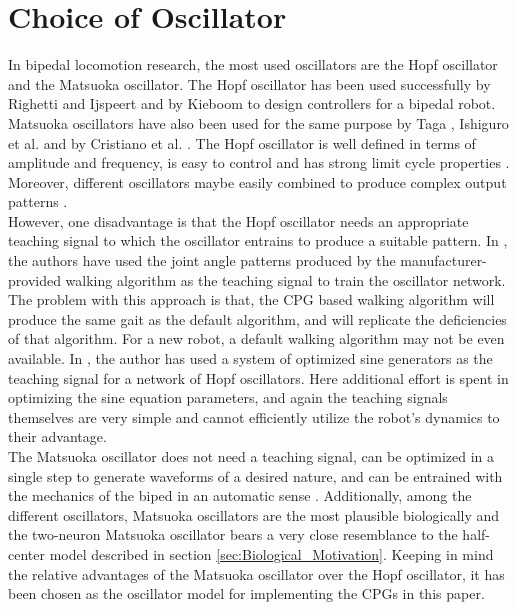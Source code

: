 \documentclass[12pt,twoside]{article}
\theoremstyle{plain}
\theoremstyle{definition}
\theoremstyle{remark}
\newcommand{\forceindent}{\leavevmode{\parindent=2em\indent}}
\begin{document}
\section{Choice of Oscillator}
\label{sec:Choice_of_Oscillator}
In bipedal locomotion research, the most used oscillators are the Hopf oscillator and the Matsuoka oscillator. The Hopf oscillator has been used successfully by Righetti and Ijspeert \cite{Righetti2006} and by Kieboom \cite{Kieboom2009} to design controllers for a bipedal robot. Matsuoka oscillators have also been used for the same purpose by Taga \cite{Taga1991}, Ishiguro et al. \cite{Ishiguro2003} and by Cristiano et al. \cite{cristiano2014locomotion}. The Hopf oscillator is well defined in terms of amplitude and frequency, is easy to control and has strong limit cycle properties \cite{Kieboom2009}. Moreover, different oscillators maybe easily combined to produce complex output patterns \cite{Righetti2006}. \\
\forceindent However, one disadvantage is that the Hopf oscillator needs an appropriate teaching signal to which the oscillator entrains to produce a suitable pattern. In \cite{Righetti2006}, the authors have used the joint angle patterns produced by the manufacturer-provided walking algorithm as the teaching signal to train the oscillator network. The problem with this approach is that, the CPG based walking algorithm will produce the same gait as the default algorithm, and will replicate the deficiencies of that algorithm. For a new robot, a default walking algorithm may not be even available. In \cite{Kieboom2009}, the author has used a system of optimized sine generators as the teaching signal for a network of Hopf oscillators. Here additional effort is spent in optimizing the sine equation parameters, and again the teaching signals themselves are very simple and cannot efficiently utilize the robot's dynamics to their advantage.\\
\forceindent The Matsuoka oscillator does not need a teaching signal, can be optimized in a single step to generate waveforms of a desired nature, and can be entrained with the mechanics of the biped in an automatic sense \cite{Kieboom2009}. Additionally, among the different oscillators, Matsuoka oscillators are the most plausible biologically and the two-neuron Matsuoka oscillator \cite{Matsuoka1987} bears a very close resemblance to the half-center model described in section \ref{sec:Biological_Motivation}. Keeping in mind the relative advantages of the Matsuoka oscillator over the Hopf oscillator, it has been chosen as the oscillator model for implementing the CPGs in this paper.
\end{document}
